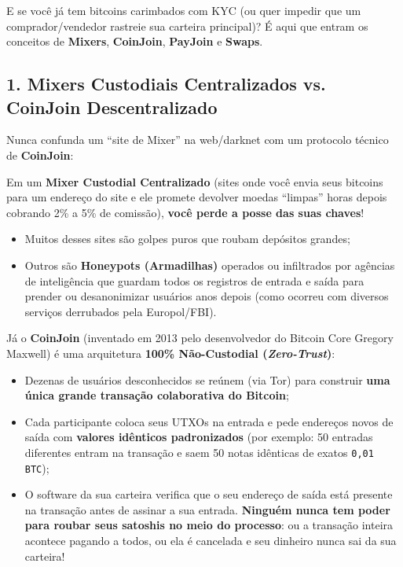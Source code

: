 \documentclass{pousadaguide}
\begin{document}
E se você já tem bitcoins carimbados com KYC (ou quer impedir que um comprador/vendedor rastreie sua carteira principal)? É aqui que entram os conceitos de \textbf{Mixers}, \textbf{CoinJoin}, \textbf{PayJoin} e \textbf{Swaps}.

\subsection{1. Mixers Custodiais Centralizados vs. CoinJoin Descentralizado}

Nunca confunda um ``site de Mixer'' na web/darknet com um protocolo técnico de \textbf{CoinJoin}:

\begin{perigo}
Em um \textbf{Mixer Custodial Centralizado} (sites onde você envia seus bitcoins para um endereço do site e ele promete devolver moedas ``limpas'' horas depois cobrando 2\% a 5\% de comissão), \textbf{você perde a posse das suas chaves}!
\begin{itemize}
  \item Muitos desses sites são golpes puros que roubam depósitos grandes;
  \item Outros são \textbf{Honeypots (Armadilhas)} operados ou infiltrados por agências de inteligência que guardam todos os registros de entrada e saída para prender ou desanonimizar usuários anos depois (como ocorreu com diversos serviços derrubados pela Europol/FBI).
\end{itemize}
\end{perigo}

Já o \textbf{CoinJoin} (inventado em 2013 pelo desenvolvedor do Bitcoin Core Gregory Maxwell) é uma arquitetura \textbf{100\% Não-Custodial (\emph{Zero-Trust})}:
\begin{itemize}
  \item Dezenas de usuários desconhecidos se reúnem (via Tor) para construir \textbf{uma única grande transação colaborativa do Bitcoin};
  \item Cada participante coloca seus UTXOs na entrada e pede endereços novos de saída com \textbf{valores idênticos padronizados} (por exemplo: 50 entradas diferentes entram na transação e saem 50 notas idênticas de exatos \texttt{0,01 BTC});
  \item O software da sua carteira verifica que o seu endereço de saída está presente na transação antes de assinar a sua entrada. \textbf{Ninguém nunca tem poder para roubar seus satoshis no meio do processo}: ou a transação inteira acontece pagando a todos, ou ela é cancelada e seu dinheiro nunca sai da sua carteira!
\end{itemize}
\end{document}
